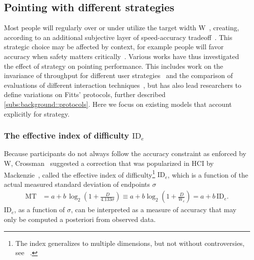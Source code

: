 \documentclass[acmlarge, manuscript,review]{acmart}
\newcommand{\mt}{\ensuremath{{\text{MT}}}\xspace}
\newcommand{\ide}{\ensuremath{{\text{ID}_e}}\xspace}
\begin{document}
\subsection{Pointing with different strategies}
Most people will regularly over or under utilize the target width W~\cite{soukoreff2004}, creating, according to \citeauthor{zhai2004nominal} an additional subjective layer of speed-accuracy tradeoff~\cite{zhai2004nominal}. This strategic choice may be affected by context, for example people will favor accuracy when safety matters critically~\cite{guiard2011b}.
Various works have thus investigated the effect of strategy on pointing performance. This includes work on the invariance of throughput for different user strategies~\cite{mackenzie2008,olafsdottir2012,batmaz2022} and the comparison of evaluations of different interaction techniques~\cite{yamanaka2023}, but has also lead researchers to define variations on Fitts' protocols, further described \autoref{subs:background::protocols}. Here we focus on existing models that account explicitly for strategy.
\subsubsection{The effective index of difficulty \ide}
Because participants do not always follow the accuracy constraint as enforced by W, Crossman~\cite{crossman1957} suggested a correction that was popularized in HCI by Mackenzie~\cite{soukoreff2004, gori2018tochi}, called the effective index of difficulty\footnote{The index generalizes to multiple dimensions, but not without controversies, see \eg~\cite{wobbrock2011,mackenzie1992,gori2023}.}
\ide, which is a function of the actual measured standard deviation of endpoints $\sigma$
\begin{align}
	\mt & = a + b\,\log_2 \left(1 + \frac{D}{4.133\sigma}\right)                       \equiv a + b \log_2 \left(1 + \frac{D}{W_e}\right)= a + b\,\text{ID}_e        . \label{eq:ide}
\end{align}
ID$_e$, as a function of $\sigma$, can be interpreted as a measure of accuracy that may only be computed a posteriori from observed data.
\end{document}

